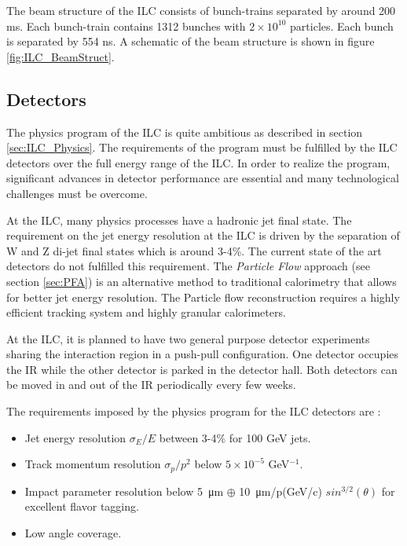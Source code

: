 The beam structure of the ILC consists of bunch-trains separated by around 200 ms. Each bunch-train contains 1312 bunches with $2 \times 10^{10}$ particles. Each bunch is separated by 554 ns. A schematic of the beam structure is shown in figure \ref{fig:ILC_BeamStruct}.

\subsection{Detectors}

The physics program of the ILC is quite ambitious as described in section \ref{sec:ILC_Physics}. The requirements of the program must be fulfilled by the ILC detectors over the full energy range of the ILC. In order to realize the program, significant advances in detector performance are essential and many technological challenges must be overcome.

At the ILC, many physics processes have a hadronic jet final state. The requirement on the jet energy resolution at the ILC is driven by the separation of W and Z di-jet final states which is around 3-4\%. The current state of the art detectors do not fulfilled this requirement. The \textit{Particle Flow} approach (see section \ref{sec:PFA}) is an alternative method to traditional calorimetry that allows for better jet energy resolution. The Particle flow reconstruction requires a highly efficient tracking system and highly granular calorimeters.

At the ILC, it is planned to have two general purpose detector experiments sharing the interaction region in a push-pull configuration. One detector occupies the IR while the other detector is parked in the detector hall. Both detectors can be moved in and out of the IR periodically every few weeks.

The requirements imposed by the physics program for the ILC detectors are \cite{ILC_TDR_Vol4}:
\begin{itemize}
  \item Jet energy resolution $\sigma_{E}/E$ between 3-4\% for 100 GeV jets.
  \item Track momentum resolution $\sigma_{p}/p^2$ below $5 \times 10^{-5}$ GeV$^{-1}$.
  \item Impact parameter resolution below \SI{5}{\micro\meter} $\oplus$ \SI{10}{\micro\meter}/p(GeV/c) $sin^{3/2}(\theta)$ for excellent flavor tagging.
  \item Low angle coverage.
\end{itemize}

